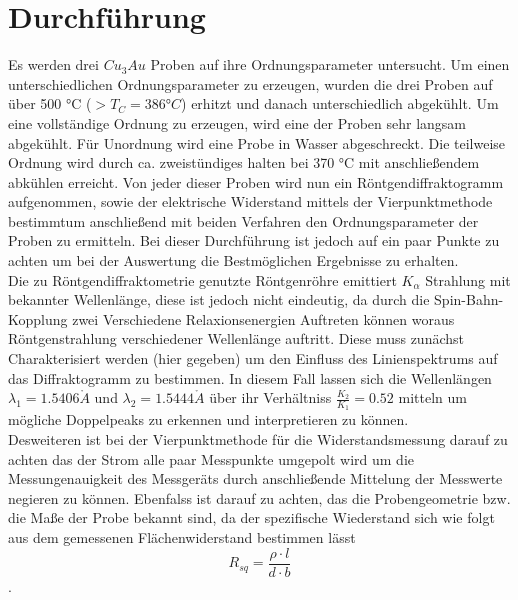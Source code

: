 \section{Durchführung}
    Es werden drei $Cu_3Au$ Proben auf ihre Ordnungsparameter untersucht. Um einen unterschiedlichen
    Ordnungsparameter zu erzeugen, wurden die drei Proben auf über 500 °C ($>T_C = 386 °C$) erhitzt
    und danach unterschiedlich abgekühlt. Um eine vollständige Ordnung zu erzeugen, wird eine der
    Proben sehr langsam abgekühlt. Für Unordnung wird eine Probe in Wasser abgeschreckt.
    Die teilweise Ordnung wird durch ca. zweistündiges halten bei 370 °C mit anschließendem abkühlen
    erreicht. Von jeder dieser Proben wird nun ein Röntgendiffraktogramm aufgenommen,
    sowie der elektrische Widerstand mittels der Vierpunktmethode bestimmtum anschließend mit beiden Verfahren den
    Ordnungsparameter der Proben zu ermitteln.
    Bei dieser Durchführung ist jedoch auf ein paar Punkte zu achten um bei der Auswertung die Bestmöglichen
    Ergebnisse zu erhalten.\\
    Die zu Röntgendiffraktometrie genutzte Röntgenröhre emittiert $K_{\alpha}$ Strahlung mit bekannter
    Wellenlänge, diese ist jedoch nicht eindeutig, da durch die Spin-Bahn-Kopplung zwei Verschiedene
    Relaxionsenergien Auftreten können woraus Röntgenstrahlung verschiedener Wellenlänge auftritt.
    Diese muss zunächst Charakterisiert werden (hier gegeben) um den Einfluss des Linienspektrums auf
    das Diffraktogramm zu bestimmen. In diesem Fall lassen sich die Wellenlängen $\lambda_1 = 1.5406\mathring{A}$
    und $\lambda_2 = 1.5444\mathring{A}$ über ihr Verhältniss $\frac{K_2}{K_1} = 0.52$ mitteln um mögliche Doppelpeaks
    zu erkennen und interpretieren zu können.\\
    Desweiteren ist bei der Vierpunktmethode für die Widerstandsmessung darauf zu achten das der Strom alle paar
    Messpunkte umgepolt wird um die Messungenauigkeit des Messgeräts durch anschließende Mittelung der 
    Messwerte negieren zu können. Ebenfalss ist darauf zu achten, das die Probengeometrie bzw. die Maße
    der Probe bekannt sind, da der spezifische Wiederstand sich wie folgt aus dem gemessenen Flächenwiderstand
    bestimmen lässt
    \begin{equation}
        R_{sq} = \frac{\rho \cdot l}{d\cdot b}
    \end{equation}.